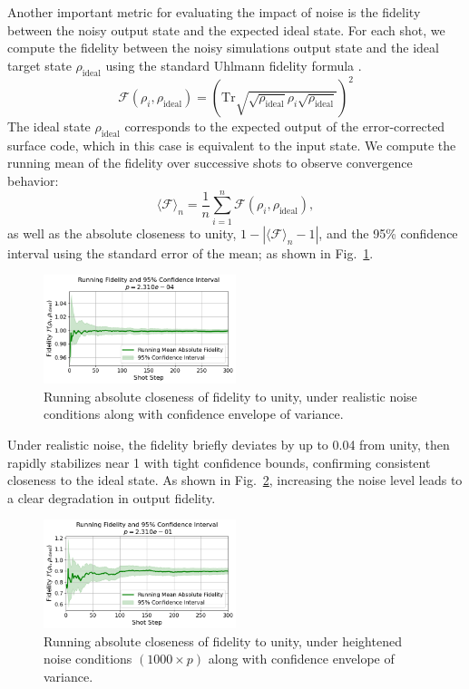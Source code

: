 \documentclass[9pt,a4paper,twocolumn,twoside]{tau-class/tau}
\begin{document}
Another important metric for evaluating the impact of noise is the fidelity between the noisy output state and the expected ideal state. For each shot, we compute the fidelity between the noisy simulations output state and the ideal target state \( \rho_{\mathrm{ideal}} \) using the standard Uhlmann fidelity formula \cite{dibartolomeo2023noisy}. 
\begin{equation}
\mathcal{F}(\rho_i, \rho_{\mathrm{ideal}}) = \left( \mathrm{Tr} \sqrt{ \sqrt{\rho_{\mathrm{ideal}}} \rho_i \sqrt{\rho_{\mathrm{ideal}}} } \right)^2
\end{equation}
The ideal state \( \rho_{\mathrm{ideal}} \) corresponds to the expected output of the error-corrected surface code, which in this case is equivalent to the input state. We compute the running mean of the fidelity over successive shots to observe convergence behavior:
\begin{equation}
\langle \mathcal{F} \rangle_n = \frac{1}{n} \sum_{i=1}^n \mathcal{F}(\rho_i, \rho_{\mathrm{ideal}}),
\end{equation}
as well as the absolute closeness to unity, \( 1 - |\langle \mathcal{F} \rangle_n - 1| \), and the 95\% confidence interval using the standard error of the mean; as shown in Fig.~\ref{fig:fidelity_convergence_realistic}.

\begin{figure}[H]
    \centering
        \includegraphics[width=0.5\textwidth]{figures/F_abs_p_real_300.png}
    \caption{Running absolute closeness of fidelity to unity, under realistic noise conditions along with confidence envelope of variance.}
    \label{fig:fidelity_convergence_realistic}
\end{figure}

Under realistic noise, the fidelity briefly deviates by up to 0.04 from unity, then rapidly stabilizes near 1 with tight confidence bounds, confirming consistent closeness to the ideal state. As shown in Fig.~\ref{fig:fidelity_convergence_worse}, increasing the noise level leads to a clear degradation in output fidelity.


\begin{figure}[H]
    \centering
        \includegraphics[width=0.5\textwidth]{figures/F_abs_p_1000x_300.png}
    \caption{Running absolute closeness of fidelity to unity, under heightened noise conditions \((1000 \times p)\) along with confidence envelope of variance.}
    \label{fig:fidelity_convergence_worse}
\end{figure}
\end{document}
